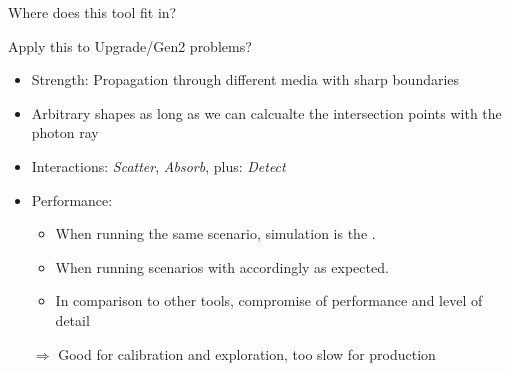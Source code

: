 
\begin{frame}[fragile]{Where does this tool fit in?}

  Apply this to Upgrade/Gen2 problems?
  \vspace{1cm}

  \begin{itemize}
    \item Strength: Propagation through \alert{different media with sharp boundaries}
    \item \alert{Arbitrary shapes} as long as we can calcualte the intersection points with the photon ray
    \item Interactions: \textit{Scatter}, \textit{Absorb}, \alert{plus: \textit{Detect}}
    \item Performance:
    \begin{itemize}
      \item When running the same scenario, simulation  is the . \checkmark
      \item When running scenarios with  accordingly as expected.
      \item In comparison to other tools, \alert{compromise} of \alert{performance} and \alert{level of detail}
    \end{itemize}
    
    \vspace{0.5cm}
    \item[$\Rightarrow$] Good for calibration and exploration, too slow for production
  \end{itemize}

\end{frame}
